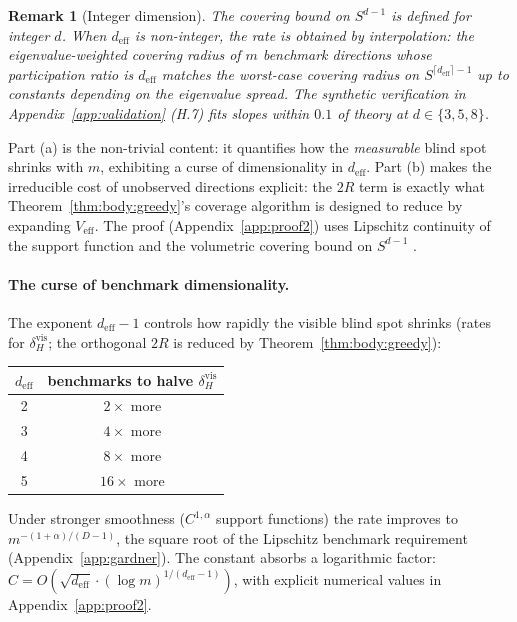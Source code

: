 \documentclass{article}
\newtheorem{remark}{Remark}
\begin{document}
\begin{remark}[Integer dimension]
The covering bound on $S^{d-1}$ is defined for integer $d$. When
$d_{\mathrm{eff}}$ is non-integer, the rate is obtained by
interpolation: the eigenvalue-weighted covering radius of $m$
benchmark directions whose participation ratio is $d_{\mathrm{eff}}$
matches the worst-case covering radius on $S^{\lceil d_{\mathrm{eff}}
\rceil - 1}$ up to constants depending on the eigenvalue spread.
The synthetic verification in Appendix~\ref{app:validation} (H.7) fits
slopes within $0.1$ of theory at $d \in \{3, 5, 8\}$.
\end{remark}

Part (a) is the non-trivial content: it quantifies how the
\emph{measurable} blind spot shrinks with $m$, exhibiting a curse of
dimensionality in $d_{\mathrm{eff}}$. Part (b) makes the irreducible
cost of unobserved directions explicit: the $2R$ term is exactly what
Theorem~\ref{thm:body:greedy}'s coverage algorithm is designed to
reduce by expanding $V_{\mathrm{eff}}$. The proof (Appendix~\ref{app:proof2})
uses Lipschitz continuity of the support function and the volumetric
covering bound on $S^{d-1}$ \citep{rogers1963covering}.

\paragraph{The curse of benchmark dimensionality.} The exponent
$d_{\mathrm{eff}} - 1$ controls how rapidly the visible blind spot
shrinks (rates for $\delta_H^{\mathrm{vis}}$; the orthogonal $2R$ is
reduced by Theorem~\ref{thm:body:greedy}):

\begin{center}\small
\renewcommand{\arraystretch}{1.05}
\begin{tabular}{cc}
\toprule
$d_{\mathrm{eff}}$ & benchmarks to halve $\delta_H^{\mathrm{vis}}$ \\
\midrule
2 & $2\times$ more \\
3 & $4\times$ more \\
4 & $8\times$ more \\
5 & $16\times$ more \\
\bottomrule
\end{tabular}
\end{center}

\noindent Under stronger smoothness ($C^{1,\alpha}$ support functions)
the rate improves to $m^{-(1+\alpha)/(D-1)}$, the square root of the
Lipschitz benchmark requirement (Appendix~\ref{app:gardner}). The
constant absorbs a logarithmic factor: $C = O(\sqrt{d_{\mathrm{eff}}}
\cdot (\log m)^{1/(d_{\mathrm{eff}} - 1)})$, with explicit numerical
values in Appendix~\ref{app:proof2}.
\end{document}
